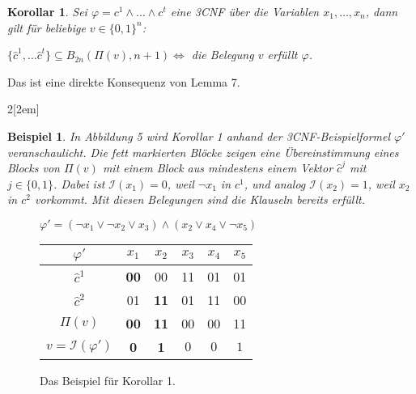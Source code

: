 \documentclass[11pt]{article}
\newtheorem{korollar}{Korollar}
\theoremstyle{break}
\theoremstyle{norm}
\newtheorem{ex}{Beispiel}
\begin{document}
\begin{korollar}
Sei $\varphi = c^1 \land \ldots \land c^t$ eine 3CNF über die Variablen $x_1,\ldots,x_n$, dann gilt für beliebige $v\in\{0,1\}^n$:
\begin{center}
    $\{\hat{c}^1, \ldots \hat{c}^t\}\subseteq B_{2n}(\Pi(v), n+1) \Leftrightarrow$ die Belegung $v$ erfüllt $\varphi$.
\end{center}
\end{korollar}
\noindent
Das ist eine direkte Konsequenz von Lemma 7.
\begin{multicols}{2}[\columnsep2em]
\vspace{0.4em}
\begin{ex}In Abbildung 5 wird Korollar 1 anhand der 3CNF-Beispielformel $\varphi'$ veranschaulicht. Die fett markierten Blöcke zeigen eine Übereinstimmung eines Blocks von $\Pi(v)$ mit einem Block aus mindestens einem Vektor $\hat{c}^j$ mit $j\in\{0,1\}$. Dabei ist $\mathcal{I}(x_1)=0$, weil $\neg x_1$ in $c^1$, und analog $\mathcal{I}(x_2)=1$, weil $x_2$ in $c^2$ vorkommt. Mit diesen Belegungen sind die Klauseln bereits erfüllt.
\end{ex}
\columnbreak
\begin{figure}[H]
        \centering
        \vspace{1em}
         $\varphi' = (\neg x_1 \lor \neg x_2 \lor x_3) \land (x_2 \lor x_4 \lor \neg x_5)$\\[1em]
        \begin{tabular}{|c||c||c||c||c||c|}
        \hline
        $\varphi'$ & $x_1$ & $x_2$ & $x_3$ & $x_4$ & $x_5$ \\
        \hline
        $\hat{c}^1$ & \textbf{00} & 00 & 11 & 01 & 01 \\
        \hline
        $\hat{c}^2$ & 01 & \textbf{11} & 01 & 11 & 00 \\
        \hline
        $\Pi(v)$ & \textbf{00} & \textbf{11} & 00 & 00 & 11 \\
        \hline
        $v = \mathcal{I}(\varphi')$ & \textbf{0} & \textbf{1} & $0$ & $0$ & $1$ \\
        \hline
        \end{tabular}
        \caption{Das Beispiel für Korollar 1.}
        \label{fig:enter-label}
\end{figure}
\end{multicols}
\end{document}
